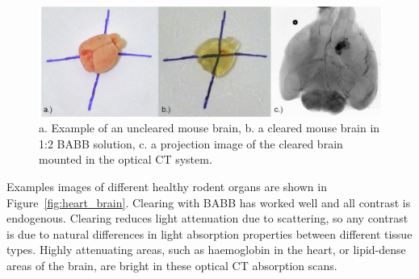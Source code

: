 	\begin{figure}[H]
		\centering
		\includegraphics[width = \textwidth]{meth_img/Brain_J5_clearing.png}
		\caption{a. Example of an uncleared mouse brain, b. a cleared mouse brain in 1:2 BABB solution, c. a projection image of the cleared brain mounted in the optical CT system.}
		\label{fig:clearing}
	\end{figure}







Examples images of different healthy rodent organs are shown in Figure~\ref{fig:heart_brain}. Clearing with BABB has worked well and all contrast is endogenous. Clearing reduces light attenuation due to scattering, so any contrast is due to natural differences in light absorption properties between different tissue types. Highly attenuating areas, such as haemoglobin in the heart, or lipid-dense areas of the brain, are bright in these optical CT absorption scans.



